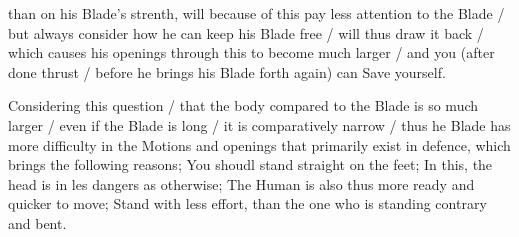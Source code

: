 \newpage


\newpage



than on his Blade's strenth, will because of this pay less attention
to the Blade / but always consider how he can keep his Blade free /
will thus draw it back / which causes his openings through this to
become much larger / and you (after done thrust / before he brings his
Blade forth again) can Save yourself.



Considering this question / that the body compared to the Blade is so
much larger / even if the Blade is long / it is comparatively narrow /
thus he Blade has more difficulty in the Motions and openings that
primarily exist in defence, which brings the following reasons; You
shoudl stand straight on the feet; In this, the head is in les dangers
as otherwise; The Human is also thus more ready and quicker to move;
Stand with less effort, than the one who is standing contrary and bent.


